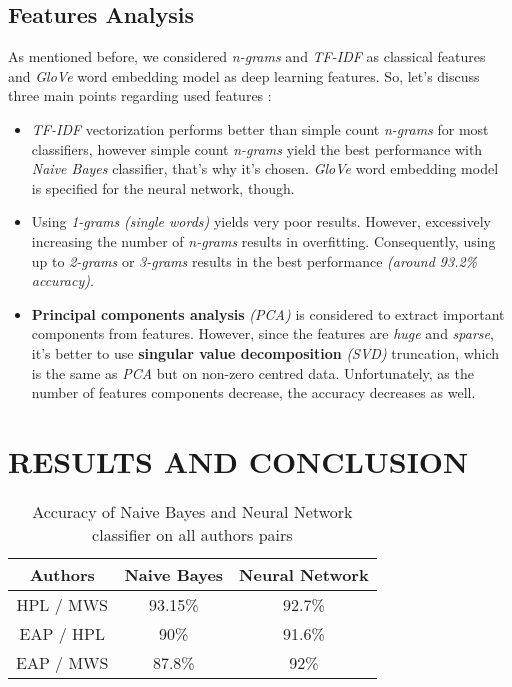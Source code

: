 \documentclass[letterpaper, 10 pt, conference]{ieeeconf}  %
\begin{document}
\subsection{Features Analysis}
As mentioned before, we considered \emph{n-grams} and \emph{TF-IDF} as classical features and \emph{GloVe} word embedding model as deep learning features. So, let's discuss three main points regarding used features :
\begin{itemize}
    \item \emph{TF-IDF} vectorization performs better than simple count \emph{n-grams} for most classifiers, however simple count \emph{n-grams} yield the best performance with \emph{Naive Bayes} classifier, that's why it's chosen. \emph{GloVe} word embedding model is specified for the neural network, though.
    \item Using \emph{1-grams} \emph{(single words)} yields very poor results. However, excessively increasing the number of \emph{n-grams} results in overfitting. Consequently, using up to \emph{2-grams} or \emph{3-grams} results in the best performance \emph{(around 93.2\% accuracy)}.
    \item \textbf{Principal components analysis} \emph{(PCA)} is considered to extract important components from features. However, since the features are \emph{huge} and \emph{sparse}, it's better to use \textbf{singular value decomposition} \emph{(SVD)} truncation, which is the same as \emph{PCA} but on non-zero centred data. Unfortunately, as the number of features components decrease, the accuracy decreases as well.
\end{itemize}


\section{RESULTS AND CONCLUSION}
\begin{table}[h!]
\centering
\begin{tabular}{||c | c | c ||} 
 \hline
 Authors & Naive Bayes & Neural Network \\ [0.5ex] 
 \hline\hline
 HPL / MWS & 93.15\% & 92.7\% \\ 
 \hline
 EAP / HPL & 90\% & 91.6\% \\
 \hline
 EAP / MWS & 87.8\% & 92\% \\
 \hline
\end{tabular}
\caption{Accuracy of Naive Bayes and Neural Network classifier on all authors pairs}
\label{table:3}
\end{table}
\end{document}

